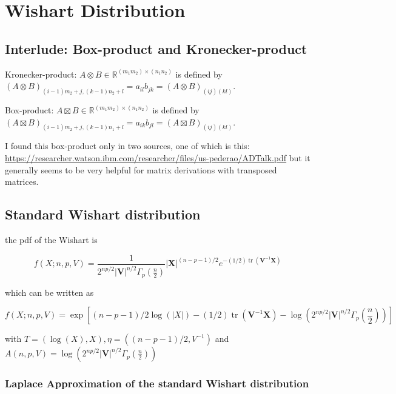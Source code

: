 \section{Wishart Distribution}

\subsection{Interlude: Box-product and Kronecker-product}

Kronecker-product: $A \otimes B \in \mathbb{R}^{(m_1m_2) \times (n_1n_2)}$ is defined by $(A \otimes B)_{(i - 1)m_2+j,(k - 1)n_2+l} = a_{il}b_{jk} = (A \otimes B)_{(ij)(kl)}$.

Box-product: $A \boxtimes B \in \mathbb{R}^{(m_1m_2) \times (n_1n_2)}$ is defined by $(A \boxtimes B)_{(i - 1)m_2+j,(k - 1)n_1+l} = a_{ik}b_{jl} = (A \boxtimes B)_{(ij)(kl)}$.

I found this box-product only in two sources, one of which is this: \url{https://researcher.watson.ibm.com/researcher/files/us-pederao/ADTalk.pdf} but it generally seems to be very helpful for matrix derivations with transposed matrices.

\subsection{Standard Wishart distribution}

the pdf of the Wishart is

\begin{equation}
f(X; n,p,V) = \frac{1}{2^{np/2} \left|{\mathbf V}\right|^{n/2} \Gamma_p\left(\frac {n}{2}\right ) }{\left|\mathbf{X}\right|}^{(n-p-1)/2} e^{-(1/2)\operatorname{tr}({\mathbf V}^{-1}\mathbf{X})}
\label{eq:wishart_pdf}
\end{equation}

which can be written as

\begin{equation}
f(X; n,p,V) = \exp \left[(n-p-1)/2 \log(|X|) -(1/2)\operatorname{tr}({\mathbf V}^{-1}\mathbf{X}) - \log\left(2^{np/2} \left|{\mathbf V}\right|^{n/2} \Gamma_p\left(\frac {n}{2}\right )\right) \right]
\end{equation}

with $T=(\log(X), X), \eta=((n-p-1)/2, V^{-1})$ and $A(n,p,V)=\log\left(2^{np/2} \left|{\mathbf V}\right|^{n/2} \Gamma_p\left(\frac {n}{2}\right )\right)$

\subsubsection{Laplace Approximation of the standard Wishart distribution}


